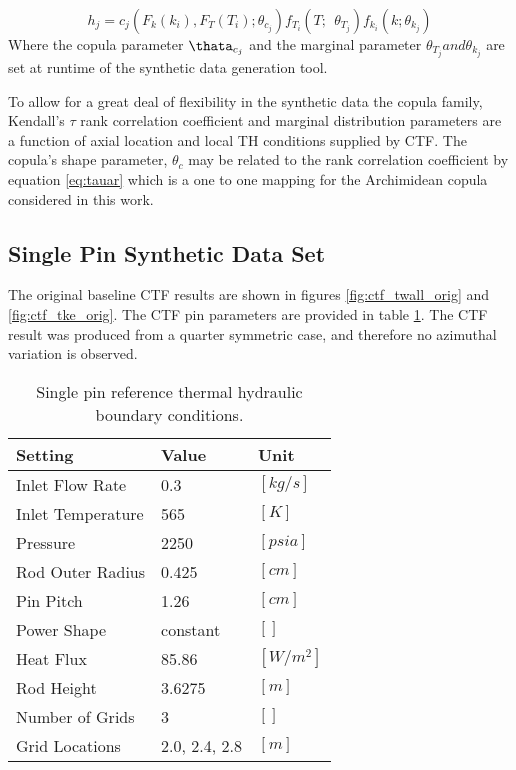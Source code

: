 \begin{equation}
    h_j = c_j(F_k(k_i), F_T(T_i); \theta_{c_j}) f_{T_i}(T;\ \ \theta_{T_j}) f_{k_i}(k; \theta_{k_j})
    \label{eq:synth_aug_face}
\end{equation}
Where the copula parameter $\thata_{c_j}$ and the marginal parameter $\theta_{T_j} and \theta_{k_j}$ are set at runtime of the synthetic data generation tool.

To allow for a great deal of flexibility in the synthetic data the copula family, Kendall's $\tau$ rank correlation coefficient and marginal distribution parameters are a function of axial location and local TH conditions supplied by CTF.  The copula's shape parameter, $\theta_c$ may be related to the rank correlation coefficient by equation \ref{eq:tauar} which is a one to one mapping for the Archimidean copula considered in this work.


\subsection{Single Pin Synthetic Data Set}

The original baseline CTF results are shown in figures \ref{fig:ctf_twall_orig} and \ref{fig:ctf_tke_orig}.  The CTF pin parameters are provided in table \ref{tab:pin_settings}.  The CTF result was produced from a quarter symmetric case, and therefore no azimuthal variation is observed.

\begin{table}[h]
    \begin{center}
        \caption{Single pin reference thermal hydraulic boundary conditions.}
        \begin{tabular}{|l|l|l|}
            \hline
            Setting & Value & Unit \\
            \hline
            Inlet Flow Rate & 0.3 & $[kg/s]$ \\
            Inlet Temperature & 565 & $[K]$ \\
            Pressure & 2250 & $[psia]$ \\
            Rod Outer Radius & 0.425 & $[cm]$ \\
            Pin Pitch & 1.26 & $[cm]$ \\
            Power Shape & constant & $[]$ \\
            Heat Flux & 85.86  & $[W/m^2]$ \\
            Rod Height & 3.6275 & $[m]$ \\
            Number of Grids & 3  & $[]$ \\
            Grid Locations & 2.0, 2.4, 2.8 & $[m]$ \\
            \hline
        \end{tabular}
    \label{tab:pin_settings}
    \end{center}
\end{table}


